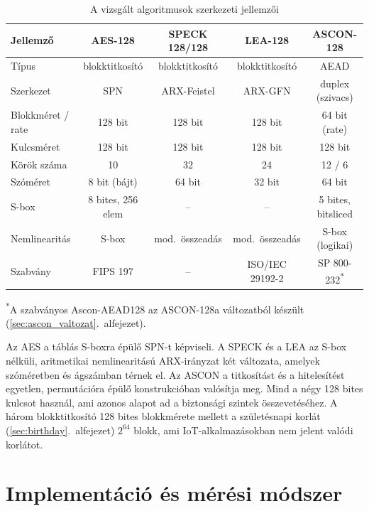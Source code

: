 \documentclass[a4paper,12pt]{report}
\theoremstyle{definition}
\theoremstyle{remark}
\begin{document}
\begin{table}[h!]
\centering
\caption{A vizsgált algoritmusok szerkezeti jellemzői}
\label{table:alg_compare}
\footnotesize
\vspace{.2 cm}
\setlength{\tabcolsep}{3.5pt}
\begin{tabular}{lcccc}
\hline
\textbf{Jellemző} & \textbf{AES-128} & \textbf{SPECK 128/128} & \textbf{LEA-128} & \textbf{ASCON-128} \\
\hline
Típus & blokktitkosító & blokktitkosító & blokktitkosító & AEAD \\
Szerkezet & SPN & ARX-Feistel & ARX-GFN & duplex (szivacs) \\
Blokkméret / rate & 128 bit & 128 bit & 128 bit & 64 bit (rate) \\
Kulcsméret & 128 bit & 128 bit & 128 bit & 128 bit \\
Körök száma & 10 & 32 & 24 & 12 / 6 \\
Szóméret & 8 bit (bájt) & 64 bit & 32 bit & 64 bit \\
S-box & 8 bites, 256 elem & -- & -- & 5 bites, bitsliced \\
Nemlinearitás & S-box & mod.\ összeadás & mod.\ összeadás & S-box (logikai) \\
Szabvány & FIPS 197 & -- & ISO/IEC 29192-2 & SP 800-232\textsuperscript{*} \\
\hline
\end{tabular}
\begin{flushleft}
\footnotesize
\textsuperscript{*}A szabványos Ascon-AEAD128 az ASCON-128a változatból készült (\ref{sec:ascon_valtozat}.~alfejezet).
\end{flushleft}
\end{table}

Az AES a táblás S-boxra épülő SPN-t képviseli. A SPECK és a LEA az S-box nélküli, aritmetikai nemlinearitású ARX-irányzat két változata, amelyek szóméretben és ágszámban térnek el. Az ASCON a titkosítást és a hitelesítést egyetlen, permutációra épülő konstrukcióban valósítja meg. Mind a négy 128 bites kulcsot használ, ami azonos alapot ad a biztonsági szintek összevetéséhez. A három blokktitkosító 128 bites blokkmérete mellett a születésnapi korlát (\ref{sec:birthday}.~alfejezet) $2^{64}$ blokk, ami IoT-alkalmazásokban nem jelent valódi korlátot.

\chapter{Implementáció és mérési módszer}\label{chap:implementacio}
\end{document}
